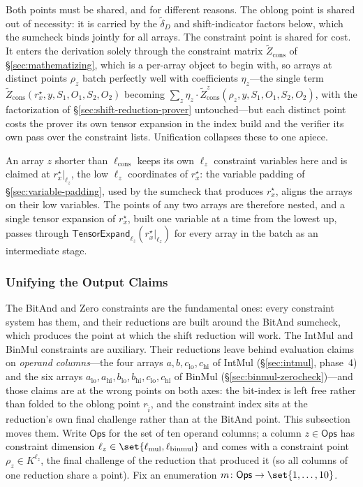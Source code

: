 \documentclass{article}
\theoremstyle{definition}
\newcommand*{\mle}{\widetilde}
\begin{document}
Both points must be shared, and for different reasons. The oblong point is shared out of necessity: it is carried by the $\mle{\delta}_D$ and shift-indicator factors below, which the sumcheck binds jointly for all arrays. The constraint point is shared for cost. It enters the derivation solely through the constraint matrix $\mle{Z}_\text{cons}$ of \S\ref{sec:mathematizing}, which is a per-array object to begin with, so arrays at distinct points $\rho_z$ batch perfectly well with coefficients $\eta_z$---the single term $\mle{Z}_\text{cons}(r^\star_x, y, S_1, O_1, S_2, O_2)$ becoming $\sum_z \eta_z \cdot \mle{Z}^z_\text{cons}(\rho_z, y, S_1, O_1, S_2, O_2)$, with the factorization of \S\ref{sec:shift-reduction-prover} untouched---but each distinct point costs the prover its own tensor expansion in the index build and the verifier its own pass over the constraint lists. Unification collapses these to one apiece.

An array $z$ shorter than $\ell_\text{cons}$ keeps its own $\ell_z$ constraint variables here and is claimed at $r^\star_x|_{\ell_z}$, the low $\ell_z$ coordinates of $r^\star_x$: the variable padding of \S\ref{sec:variable-padding}, used by the sumcheck that produces $r^\star_x$, aligns the arrays on their low variables. The points of any two arrays are therefore nested, and a single tensor expansion of $r^\star_x$, built one variable at a time from the lowest up, passes through $\textsf{TensorExpand}_{\ell_z}(r^\star_x|_{\ell_z})$ for every array in the batch as an intermediate stage.

\subsubsection{Unifying the Output Claims}
\label{sec:rz-unification}

The BitAnd and Zero constraints are the fundamental ones: every constraint system has them, and their reductions are built around the BitAnd sumcheck, which produces the point at which the shift reduction will work. The IntMul and BinMul constraints are auxiliary. Their reductions leave behind evaluation claims on \emph{operand columns}---the four arrays $a, b, c_\text{lo}, c_\text{hi}$ of IntMul (\S\ref{sec:intmul}, phase~4) and the six arrays $a_\text{lo}, a_\text{hi}, b_\text{lo}, b_\text{hi}, c_\text{lo}, c_\text{hi}$ of BinMul (\S\ref{sec:binmul-zerocheck})---and those claims are at the wrong points on both axes: the bit-index is left free rather than folded to the oblong point $r_{\widehat{i}}$, and the constraint index sits at the reduction's own final challenge rather than at the BitAnd point. This subsection moves them. Write $\textsf{Ops}$ for the set of ten operand columns; a column $z \in \textsf{Ops}$ has constraint dimension $\ell_z \in \set{\ell_\text{mul}, \ell_\text{binmul}}$ and comes with a constraint point $\rho_z \in K^{\ell_z}$, the final challenge of the reduction that produced it (so all columns of one reduction share a point). Fix an enumeration $m \colon \textsf{Ops} \to \set{1, \ldots, 10}$.
\end{document}
